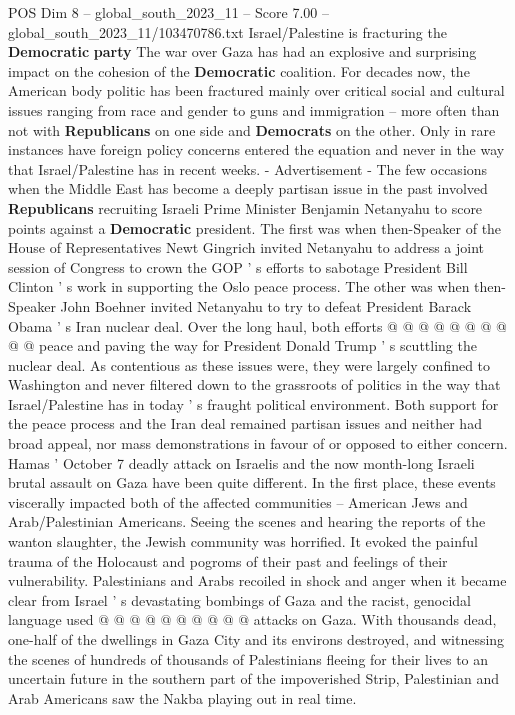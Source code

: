 \begin{textsample}{POS Dim 8 – global\_south\_2023\_11 – Score 7.00 – global\_south\_2023\_11/103470786.txt}  \label{ex:f8_pos_272}
Israel/Palestine is fracturing the \textbf{Democratic} \textbf{party} The war over Gaza has had an explosive and surprising impact on the cohesion of the \textbf{Democratic} coalition.
For decades now, the American body politic has been fractured mainly over critical social and cultural issues ranging from race and gender to guns and immigration -- more often than not with \textbf{Republicans} on one side and \textbf{Democrats} on the other.
Only in rare instances have foreign policy concerns entered the equation and never in the way that Israel/Palestine has in recent weeks. - Advertisement - The few occasions when the Middle East has become a deeply partisan issue in the past involved \textbf{Republicans} recruiting Israeli Prime Minister Benjamin Netanyahu to score points against a \textbf{Democratic} president.
The first was when then-Speaker of the House of Representatives Newt Gingrich invited Netanyahu to address a joint session of Congress to crown the GOP ' s efforts to sabotage President Bill Clinton ' s work in supporting the Oslo peace process.
The other was when then-Speaker John Boehner invited Netanyahu to try to defeat President Barack Obama ' s Iran nuclear deal.
Over the long haul, both efforts @ @ @ @ @ @ @ @ @ @ peace and paving the way for President Donald Trump ' s scuttling the nuclear deal.
As contentious as these issues were, they were largely confined to Washington and never filtered down to the grassroots of politics in the way that Israel/Palestine has in today ' s fraught political environment.
Both support for the peace process and the Iran deal remained partisan issues and neither had broad appeal, nor mass demonstrations in favour of or opposed to either concern.
Hamas ' October 7 deadly attack on Israelis and the now month-long Israeli brutal assault on Gaza have been quite different.
In the first place, these events viscerally impacted both of the affected communities -- American Jews and Arab/Palestinian Americans.
Seeing the scenes and hearing the reports of the wanton slaughter, the Jewish community was horrified.
It evoked the painful trauma of the Holocaust and pogroms of their past and feelings of their vulnerability.
Palestinians and Arabs recoiled in shock and anger when it became clear from Israel ' s devastating bombings of Gaza and the racist, genocidal language used @ @ @ @ @ @ @ @ @ @ attacks on Gaza.
With thousands dead, one-half of the dwellings in Gaza City and its environs destroyed, and witnessing the scenes of hundreds of thousands of Palestinians fleeing for their lives to an uncertain future in the southern part of the impoverished Strip, Palestinian and Arab Americans saw the Nakba playing out in real time.

\end{textsample}
